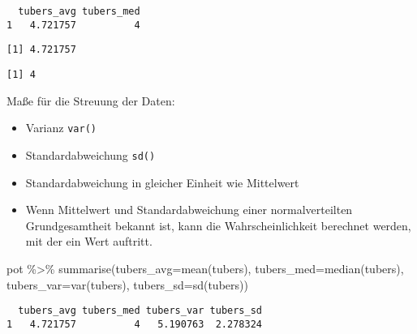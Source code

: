 \documentclass[
  letterpaper,
  DIV=11,
  numbers=noendperiod]{scrartcl}
\newenvironment{Shaded}{\begin{snugshade}}{\end{snugshade}}
\newcommand{\AttributeTok}[1]{\textcolor[rgb]{0.40,0.45,0.13}{#1}}
\newcommand{\FunctionTok}[1]{\textcolor[rgb]{0.28,0.35,0.67}{#1}}
\newcommand{\NormalTok}[1]{\textcolor[rgb]{0.00,0.23,0.31}{#1}}
\newcommand{\SpecialCharTok}[1]{\textcolor[rgb]{0.37,0.37,0.37}{#1}}
\providecommand{\tightlist}{%
  \setlength{\itemsep}{0pt}\setlength{\parskip}{0pt}}\usepackage{longtable,booktabs,array}
\begin{document}
\begin{verbatim}
  tubers_avg tubers_med
1   4.721757          4
\end{verbatim}

\begin{Shaded}
\end{Shaded}

\begin{verbatim}
[1] 4.721757
\end{verbatim}

\begin{Shaded}
\end{Shaded}

\begin{verbatim}
[1] 4
\end{verbatim}

Maße für die Streuung der Daten:

\begin{itemize}
\tightlist
\item
  Varianz \texttt{var()}
\item
  Standardabweichung \texttt{sd()}
\item
  Standardabweichung in gleicher Einheit wie Mittelwert
\item
  Wenn Mittelwert und Standardabweichung einer normalverteilten
  Grundgesamtheit bekannt ist, kann die Wahrscheinlichkeit berechnet
  werden, mit der ein Wert auftritt.
\end{itemize}

\begin{Shaded}
\begin{Highlighting}[]
\NormalTok{pot }\SpecialCharTok{\%\textgreater{}\%} 
  \FunctionTok{summarise}\NormalTok{(}\AttributeTok{tubers\_avg=}\FunctionTok{mean}\NormalTok{(tubers),}
            \AttributeTok{tubers\_med=}\FunctionTok{median}\NormalTok{(tubers),}
            \AttributeTok{tubers\_var=}\FunctionTok{var}\NormalTok{(tubers),}
            \AttributeTok{tubers\_sd=}\FunctionTok{sd}\NormalTok{(tubers))}
\end{Highlighting}
\end{Shaded}

\begin{verbatim}
  tubers_avg tubers_med tubers_var tubers_sd
1   4.721757          4   5.190763  2.278324
\end{verbatim}
\end{document}
